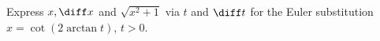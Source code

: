 Express $x, \diff x $ and $\sqrt{x^2+1}$ via $t$ and $\diff t$ for the Euler substitution $x=\cot(2\arctan t)$, $t>0$.
